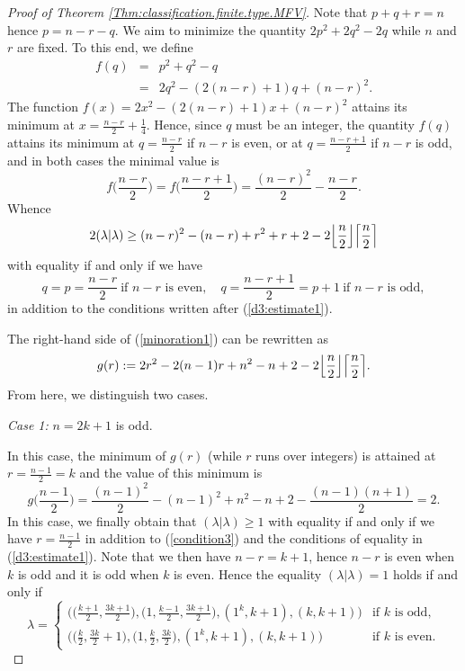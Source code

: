 \documentclass[12pt,reqno]{amsart}
\begin{document}
\begin{proof}[Proof  of Theorem \ref{Thm:classification.finite.type.MFV}]
Note that $p+q+r=n$ hence $p=n-r-q$. We aim to minimize the quantity $2p^2+2q^2-2q$ while $n$ and $r$ are fixed. To this end, we define
\begin{eqnarray*}
f(q) & = & p^2+q^2-q \\
 & = & 2q^2-(2(n-r)+1)q+(n-r)^2.
\end{eqnarray*}
The function $f(x)=2x^2-(2(n-r)+1)x+(n-r)^2$ attains its minimum at $x=\frac{n-r}{2}+\frac{1}{4}$. Hence, since $q$ must be an integer, the quantity $f(q)$ attains its minimum at $q=\frac{n-r}{2}$ if $n-r$ is even, or at $q=\frac{n-r+1}{2}$ if $n-r$ is odd, and in both cases the minimal value is
$$
f\Big(\frac{n-r}{2}\Big)=f\Big(\frac{n-r+1}{2}\Big)=\frac{(n-r)^2}{2}-\frac{n-r}{2}.
$$
Whence
\begin{equation}\label{minoration1}
2(\lambda|\lambda)\geq (n-r)^2-(n-r)+r^2+r+2-2\Bigl\lfloor\frac{n}{2}\Bigr\rfloor \Bigl\lceil\frac{n}{2}\Bigr\rceil
\end{equation}
with equality if and only if we have
\begin{equation}
\label{condition3}
q=p=\frac{n-r}{2}\ \mbox{if $n-r$ is even},\quad
q=\frac{n-r+1}{2}=p+1\ \mbox{if $n-r$ is odd},
\end{equation}
in addition to the conditions written after (\ref{d3:estimate1}).

The right-hand side of (\ref{minoration1}) can be rewritten as
$$
g(r):=2r^2-2(n-1)r+n^2-n+2-2\Bigl\lfloor\frac{n}{2}\Bigr\rfloor \Bigl\lceil\frac{n}{2}\Bigr\rceil.
$$
From here, we distinguish two cases.

\medskip
\noindent
{\it Case 1:} $n=2k+1$ is odd.

In this case, the minimum of $g(r)$ (while $r$ runs over integers) is attained at $r=\frac{n-1}{2}=k$ and the value of this minimum is
$$
g\Big(\frac{n-1}{2}\Big)=\frac{(n-1)^2}{2}-(n-1)^2+n^2-n+2-\frac{(n-1)(n+1)}{2}=2.
$$
In this case, we finally obtain that
$(\lambda|\lambda)\geq 1$ with equality if and only if we have $r=\frac{n-1}{2}$ in addition to (\ref{condition3}) and the conditions of equality in (\ref{d3:estimate1}).
Note that we then have $n-r=k+1$, hence $n-r$ is even when $k$ is odd and it is odd when $k$ is even.
Hence the equality $(\lambda|\lambda)=1$ holds if and only if
$$
\lambda = \left\{
\begin{array}{ll}
\displaystyle
\Big(\Big(\frac{k+1}{2},\frac{3k+1}{2}\Big),\Big(1,\frac{k-1}{2},\frac{3k+1}{2}\Big),(1^k,k+1),(k,k+1)\Big) & \mbox{if $k$ is odd}, \\[2mm]
\displaystyle
\Big(\Big(\frac{k}{2},\frac{3k}{2}+1\Big),\Big(1,\frac{k}{2},\frac{3k}{2}\Big),(1^k,k+1),(k,k+1)\Big) & \mbox{if $k$ is even}.
\end{array}
\right.
$$


\end{proof}
\end{document}
